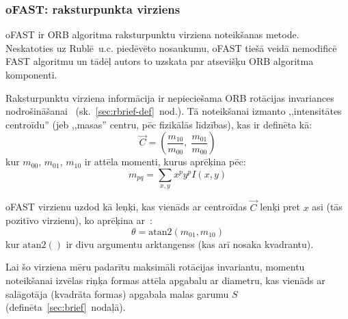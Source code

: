 \subsubsection{oFAST: raksturpunkta virziens} \label{sec:ofast}
oFAST ir ORB algoritma raksturpunktu virziena noteikšanas metode.
Neskatoties uz Rublē~u.c.\cite{ORB} piedēvēto nosaukumu, oFAST tiešā veidā
nemodificē FAST algoritmu un tādēļ autors to uzskata par atsevišķu ORB
algoritma komponenti.

Raksturpunktu virziena informācija ir nepieciešama
ORB rotācijas invariances nodrošināšanai~\cite{ORB}
(sk.~\ref{sec:rbrief-def}~nod.).
Tā noteikšanai izmanto
,,intensitātes centroīdu''\cite{Rosin}\cite{ORB} (jeb ,,masas'' centru, pēc fizikālās
līdzības), kas ir definēta kā:
\begin{equation}
	\vec{C} = \left( \frac{m_{10}}{m_{00}},\; \frac{m_{01}}{m_{00}} \right)
\end{equation}
kur $m_{00}$, $m_{01}$, $m_{10}$ ir attēla momenti, kurus aprēķina pēc:
\begin{equation}
	m_{pq} = \sum_{x,y} x^p y^p I(x,y)
\end{equation}

oFAST virzienu uzdod kā leņķi, kas vienāds ar centroīdas $\vec{C}$
lenķi pret $x$ asi (tās pozitīvo virzienu), ko aprēķina ar~\cite{ORB}:
\begin{equation}
	\theta = \mathrm{atan2}(m_{01}, m_{10})
\end{equation}
kur $\mathrm{atan2}()$ ir divu argumentu arktangenss (kas arī nosaka kvadrantu).

Lai šo virziena mēru padarītu maksimāli rotācijas invariantu,
momentu noteikšanai izvēlas riņķa formas attēla apgabalu ar diametru, kas
vienāds ar salāgotāja (kvadrāta formas) apgabala malas garumu $S$
(definēta~\ref{sec:brief}~nodaļā).
